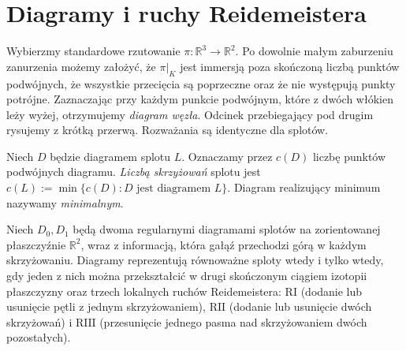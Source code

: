 \section{Diagramy i ruchy Reidemeistera}
\label{sec:kt-diagramy}

Wybierzmy standardowe rzutowanie $\pi\colon\mathbb R^3\to\mathbb R^2$.
Po dowolnie małym zaburzeniu zanurzenia możemy założyć, że $\pi|_K$
jest immersją poza skończoną liczbą punktów podwójnych, że wszystkie
przecięcia są poprzeczne oraz że nie występują punkty potrójne.
Zaznaczając przy każdym punkcie podwójnym, które z dwóch włókien
leży wyżej, otrzymujemy \emph{diagram węzła}. Odcinek przebiegający
pod drugim rysujemy z krótką przerwą. Rozważania są identyczne dla
splotów.

\begin{center}
\end{center}

\begin{definicja}
Niech $D$ będzie diagramem splotu $L$. Oznaczamy przez $c(D)$ liczbę
punktów podwójnych diagramu. \emph{Liczbą skrzyżowań} splotu jest
$c(L):=\min\{c(D):D\text{ jest diagramem }L\}$. Diagram realizujący
minimum nazywamy \emph{minimalnym}.
\end{definicja}

\begin{twierdzenie}[Reidemeister]
Niech $D_0,D_1$ będą dwoma regularnymi diagramami splotów
na zorientowanej płaszczyźnie $\mathbb R^2$, wraz z informacją,
która gałąź przechodzi górą w każdym skrzyżowaniu. Diagramy reprezentują równoważne sploty wtedy
i tylko wtedy, gdy jeden z nich można przekształcić w drugi
skończonym ciągiem izotopii płaszczyzny oraz trzech lokalnych
ruchów Reidemeistera: $\mathrm{R I}$ (dodanie lub usunięcie
pętli z jednym skrzyżowaniem), $\mathrm{R II}$ (dodanie lub
usunięcie dwóch skrzyżowań) i $\mathrm{R III}$ (przesunięcie
jednego pasma nad skrzyżowaniem dwóch pozostałych).
\end{twierdzenie}

